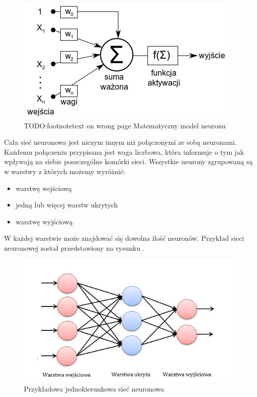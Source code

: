 \begin{figure}[ht!]
\centering
\includegraphics{res/neuron.png}
\caption[Caption for LOF]{TODO:footnotetext on wrong page Matematyczny model neuronu\label{neuron}\footnotemark}
\end{figure} 


Cała sieć neuronowa jest niczym innym niż połączonymi ze sobą neuronami. Każdemu połączeniu przypisana jest waga liczbowa, która informuje o tym jak wpływają na siebie poszczególne komórki sieci. Wszystkie neurony zgrupowaną są w warstwy z których możemy wyróżnić:
\begin{itemize}
\item warstwę wejściową
\item jedną lub więcej warstw ukrytych
\item warstwę wyjściową
\end{itemize}

W każdej warstwie może znajdować się dowolna ilość neuronów. Przykład sieci neuronowej został przedstawiony na rysunku \label{net}.

\begin{figure}[ht!]
\centering
\includegraphics{res/exampleNet.png}
\caption[Caption for LOF]{Przykładowa jednokierunkowa sieć neuronowa\label{net}\footnotemark} 
\end{figure}

